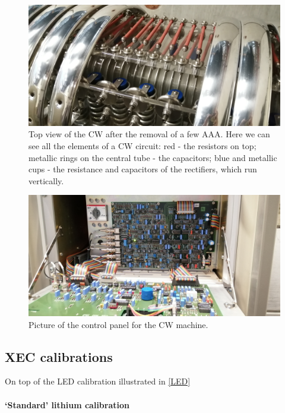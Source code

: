 \begin{refsection}
        \begin{figure}
            \centering
            \includegraphics[width=1\textwidth]{Figures/MEG/CW/view_top.jpg}
            \caption{Top view of the CW after the removal of a few AAA. Here we can see all the elements of a CW circuit: red - the resistors on top; metallic rings on the central tube - the capacitors; blue and metallic cups - the resistance and capacitors of the rectifiers, which run vertically.}
            \label{fig:CW:view_top}
        \end{figure}

        \begin{figure}
            \centering
            \includegraphics[width=1\textwidth]{Figures/MEG/CW/panel.jpg}
            \caption{Picture of the control panel for the CW machine.}
            \label{fig:CW:panel}
        \end{figure}

    \subsection{XEC calibrations}
        On top of the LED calibration illustrated in \ref{LED} 
        \paragraph{`Standard' lithium calibration}

\end{refsection}
